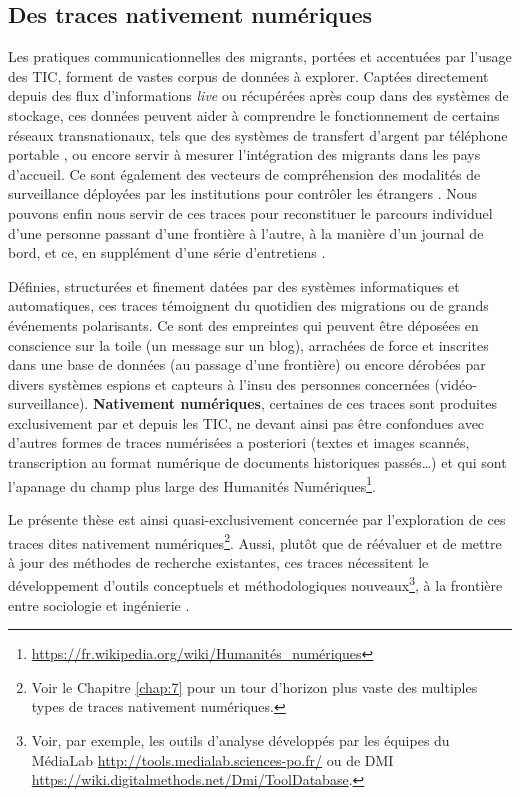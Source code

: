 \documentclass[symmetric,justified,marginals=raggedouter]{tufte-book}
\begin{document}
\subsection{Des traces nativement numériques}

\noindent Les pratiques communicationnelles des migrants, portées et accentuées par l'usage des TIC, forment de vastes corpus de données à explorer. Captées directement depuis des flux d'informations \textit{live} ou récupérées après coup dans des systèmes de stockage, ces données peuvent aider à comprendre le fonctionnement de certains réseaux transnationaux, tels que des systèmes de transfert d'argent par téléphone portable \citep{bounie_analyse_2010}, ou encore servir à mesurer l'inté\-gration des migrants dans les pays d'accueil. Ce sont également des vecteurs de compréhension des modalités de surveillance déployées par les institutions pour contrôler les étrangers \citep{amoore_biometric_2006}. Nous pouvons enfin nous servir de ces traces pour reconstituer le parcours individuel d'une personne passant d'une frontière à l'autre, à la manière d'un journal de bord, et ce, en supplément d'une série d'entretiens \citep{diminescu_traces_2016}.

Définies, structurées et finement datées par des systèmes informatiques et automatiques, ces traces témoignent du quotidien des migrations ou de grands événements polarisants. Ce sont des empreintes \citep{rogers_end_2009} qui peuvent être déposées en conscience sur la toile (un message sur un blog), arrachées de force et inscrites dans une base de données (au passage d'une frontière) ou encore dérobées par divers systèmes espions et capteurs à l'insu des personnes concernées (vidéo-surveillance). \textbf{Nativement numériques}, certaines de ces traces sont produites exclusivement par et depuis les TIC, ne devant ainsi pas être confondues avec d'autres formes de traces numérisées a posteriori (textes et images scannés, transcription au format numérique de documents historiques passés\ldots{}) et qui sont l'apanage du champ plus large des Humanités Numériques\footnote{\RaggedOuter \url{https://fr.wikipedia.org/wiki/Humanités_numériques}}. 

Le présente thèse est ainsi quasi-exclusivement concernée par l'exploration de ces traces dites nativement numériques\footnote{\RaggedOuter Voir le Chapitre \ref{chap:7} pour un tour d'horizon plus vaste des multiples types de traces nativement numériques.}. Aussi, plutôt que de réévaluer et de mettre à jour des méthodes de recherche existantes, ces traces nécessitent le développement d'outils conceptuels et méthodologiques nouveaux\footnote{\RaggedOuter Voir, par exemple, les outils d'analyse développés par les équipes du MédiaLab \url{http://tools.medialab.sciences-po.fr/} ou de DMI \url{https://wiki.digitalmethods.net/Dmi/ToolDatabase}.}, à la frontière entre sociologie et ingénierie \citep{barats_manuel_2016}. 
\end{document}
